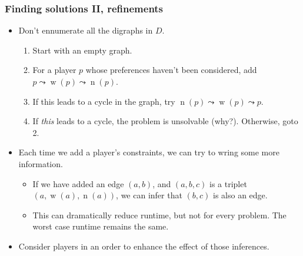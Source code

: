 \documentclass[svgnames]{beamer}
\DeclareMathOperator{\w}{w}
\DeclareMathOperator{\n}{n}
\begin{document}
\begin{frame}
\frametitle{Finding solutions II, refinements}
\begin{itemize}
    \item<1-> Don't ennumerate all the digraphs in $D$.
    \begin{enumerate}
        \item<2-> Start with an empty graph.
        \item<3-> For a player $p$ whose preferences haven't been considered, add $p \leadsto \w(p) \leadsto \n(p)$.
        \item<4-> If this leads to a cycle in the graph, try $\n(p) \leadsto \w(p) \leadsto p$.
        \item<5-> If \emph{this} leads to a cycle, the problem is unsolvable (why?). Otherwise, goto 2.
    \end{enumerate}
    \item<6-> Each time we add a player's constraints, we can try to wring some more information.
    \begin{itemize}
        \item<7-> If we have added an edge $(a, b)$, and $(a, b, c)$ is a triplet $(a, \w(a), \n(a))$, we can infer that $(b,c)$ is also an edge.
        \item<8-> This can dramatically reduce runtime, but not for every problem. The worst case runtime remains the same.
    \end{itemize}
    \item<9-> Consider players in an order to enhance the effect of those inferences.
\end{itemize}
\end{frame}
\end{document}
